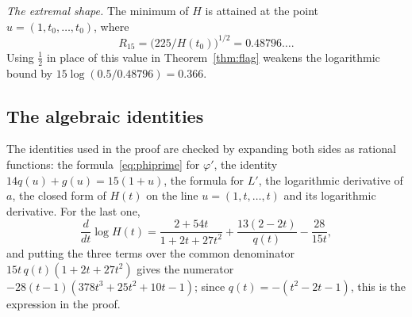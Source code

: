 \documentclass[11pt]{amsart}
\theoremstyle{definition}
\theoremstyle{remark}
\begin{document}
\emph{The extremal shape.} The minimum of $H$ is attained at the point
$u=(1,t_0,\dots,t_0)$, where
\[
 R_{15}=\bigl(225/H(t_0)\bigr)^{1/2}=0.48796\ldots .
\]
Using $\frac12$ in place of this value in Theorem~\ref{thm:flag} weakens
the logarithmic bound by $15\log(0.5/0.48796)=0.366$.

\subsection{The algebraic identities}

The identities used in the proof are checked by expanding both sides as
rational functions: the formula~\eqref{eq:phiprime} for $\varphi'$, the
identity $14q(u)+g(u)=15(1+u)$, the formula for $L'$, the logarithmic
derivative of $a$, the closed form of $H(t)$ on the line
$u=(1,t,\dots,t)$ and its logarithmic derivative. For the last one,
\[
 \frac{d}{dt}\log H(t)=\frac{2+54t}{1+2t+27t^2}+\frac{13(2-2t)}{q(t)}
 -\frac{28}{15t},
\]
and putting the three terms over the common denominator
$15t\,q(t)(1+2t+27t^2)$ gives the numerator
$-28(t-1)(378t^3+25t^2+10t-1)$; since $q(t)=-(t^2-2t-1)$, this is the
expression in the proof.
\end{document}
